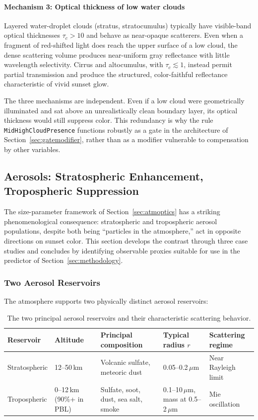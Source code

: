 \documentclass[11pt,a4paper]{article}
\begin{document}
\paragraph{Mechanism 3: Optical thickness of low water clouds} Layered water-droplet clouds (stratus, stratocumulus) typically have visible-band optical thicknesses $\tau_c > 10$ and behave as near-opaque scatterers. Even when a fragment of red-shifted light does reach the upper surface of a low cloud, the dense scattering volume produces near-uniform gray reflectance with little wavelength selectivity. Cirrus and altocumulus, with $\tau_c \lesssim 1$, instead permit partial transmission and produce the structured, color-faithful reflectance characteristic of vivid sunset glow.

The three mechanisms are independent. Even if a low cloud were geometrically illuminated and sat above an unrealistically clean boundary layer, its optical thickness would still suppress color. This redundancy is why the rule \texttt{MidHighCloudPresence} functions robustly as a gate in the architecture of Section~\ref{sec:gatemodifier}, rather than as a modifier vulnerable to compensation by other variables.

\subsection{Aerosols: Stratospheric Enhancement, Tropospheric Suppression}

The size-parameter framework of Section~\ref{sec:atmoptics} has a striking phenomenological consequence: stratospheric and tropospheric aerosol populations, despite both being ``particles in the atmosphere,'' act in opposite directions on sunset color. This section develops the contrast through three case studies and concludes by identifying observable proxies suitable for use in the predictor of Section~\ref{sec:methodology}.

\subsubsection{Two Aerosol Reservoirs}

The atmosphere supports two physically distinct aerosol reservoirs:

\begin{table}[H]
\centering
\small
\begin{tabular}{lllll}
\toprule
Reservoir & Altitude & Principal composition & Typical radius $r$ & Scattering regime \\
\midrule
Stratospheric & 12--50\,km & Volcanic sulfate, meteoric dust & 0.05--0.2\,$\mu$m & Near Rayleigh limit \\
Tropospheric & 0--12\,km (90\%+ in PBL) & Sulfate, soot, dust, sea salt, smoke & 0.1--10\,$\mu$m, mass at 0.5--2\,$\mu$m & Mie oscillation \\
\bottomrule
\end{tabular}
\caption{The two principal aerosol reservoirs and their characteristic scattering behavior.}
\label{tab:aerosols}
\end{table}
\end{document}
